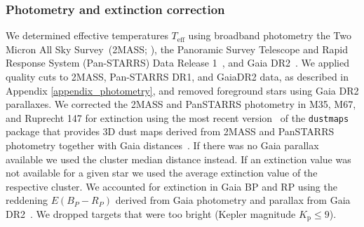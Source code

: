 \documentclass{aa}
\begin{document}

\subsubsection{Photometry and extinction correction}
We determined effective temperatures $T_\mathrm{eff}$ using broadband photometry the Two Micron All Sky Survey~(2MASS; \citealt{skrutskie_two_2006}), the Panoramic Survey Telescope and Rapid Response System \mbox{(Pan-STARRS)} Data Release 1~\citep{2016arXiv161205560C}, and Gaia DR2~\citep{gaia_dr2_release_2018}. We applied quality cuts to 2MASS, Pan-STARRS DR1, and GaiaDR2 data, as described in Appendix \ref{appendix_photometry}, and removed foreground stars using Gaia DR2 parallaxes. We corrected the 2MASS and PanSTARRS photometry in M35, M67, and Ruprecht 147 for extinction using the most recent version~\citep{green_bayestar_2019} of the \texttt{dustmaps} package that provides 3D dust maps derived from 2MASS and PanSTARRS photometry together with Gaia distances~\citep{green_dustmaps_2018}. If there was no Gaia parallax available we used the cluster median distance instead. If an extinction value was not available for a given star we used the average extinction value of the respective cluster. We accounted for extinction in Gaia BP and RP using the reddening $E(B_P-R_P)$ derived from Gaia photometry and parallax from Gaia DR2~\citep{andrae_gaiaapsis_2018}. We dropped targets that were too bright (Kepler magnitude $K_\mathrm{p} \leq 9$).
\\
\end{document}
